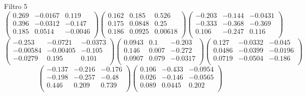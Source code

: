 Filtro 5
{ \small
\[
\begin{pmatrix}
  0.269 & -0.0167 & 0.119 \\
  0.396 & -0.0312 & -0.147 \\
  0.185 & 0.0514 & -0.0046 \\
\end{pmatrix}
\begin{pmatrix}
  0.162 & 0.185 & 0.526 \\
  0.175 & 0.0848 & 0.25 \\
  0.186 & 0.0925 & 0.00618 \\
\end{pmatrix}
\begin{pmatrix}
  -0.203 & -0.144 & -0.0431 \\
  -0.333 & -0.368 & -0.369 \\
  0.106 & -0.247 & 0.116 \\
\end{pmatrix}
\]
\[
\begin{pmatrix}
  -0.253 & -0.0721 & -0.0373 \\
  -0.00584 & -0.00405 & -0.105 \\
  -0.0279 & 0.195 & 0.101 \\
\end{pmatrix}
\begin{pmatrix}
  0.0943 & 0.1 & -0.203 \\
  0.146 & 0.007 & -0.272 \\
  0.0907 & 0.079 & -0.0317 \\
\end{pmatrix}
\begin{pmatrix}
  0.127 & -0.0332 & -0.045 \\
  0.0486 & -0.0399 & -0.0196 \\
  0.0719 & -0.0504 & -0.186 \\
\end{pmatrix}
\]
\[
\begin{pmatrix}
  -0.137 & -0.216 & -0.176 \\
  -0.198 & -0.257 & -0.48 \\
  0.446 & 0.209 & 0.739 \\
\end{pmatrix}
\begin{pmatrix}
  0.106 & -0.433 & -0.0954 \\
  0.026 & -0.146 & -0.0565 \\
  0.089 & 0.0445 & 0.202 \\
\end{pmatrix}
\]
}

